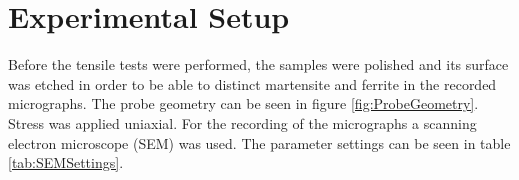 \section{Experimental Setup}

Before the tensile tests were performed, the samples were polished and its surface was etched in order to be able to distinct martensite and ferrite in the recorded micrographs. The probe geometry can be seen in figure \ref{fig:ProbeGeometry}. Stress was applied uniaxial. For the recording of the micrographs a scanning electron microscope (SEM) was used. The parameter settings can be seen in table \ref{tab:SEMSettings}.